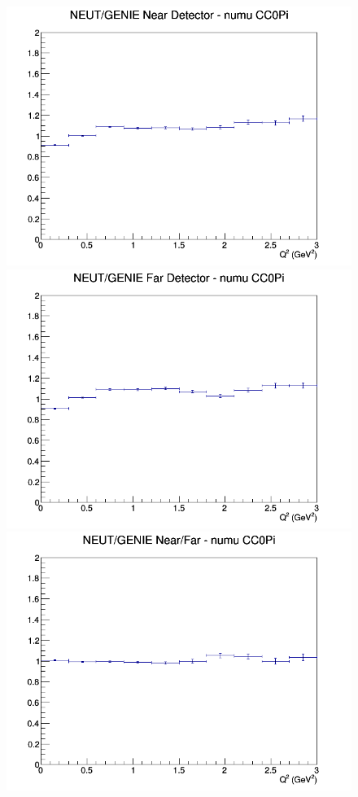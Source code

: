 \documentclass[12pt]{article}
\begin{document}
\begin{figure}[h]
\endminipage
\newline
{}
\includegraphics[width=\linewidth]{Q2/nominal/ratios/CC0Pi_NEUT_GENIE_numu_near_Q2.png}
\endminipage
{}
\includegraphics[width=\linewidth]{Q2/nominal/ratios/CC0Pi_NEUT_GENIE_numu_far_Q2.png}
\endminipage
{}
\includegraphics[width=\linewidth]{Q2/nominal/ratios/CC0Pi_NEUT_GENIE_numu_NF_Q2.png}

\end{figure}
\end{document}
